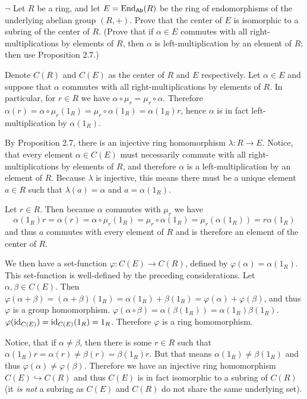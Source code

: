 \begin{problem}
	$\neg$ Let $R$ be a ring, and let $E = \mathrm{End}_{\mathsf{Ab}}(R)$ be the ring of endomorphisms of the underlying abelian group $(R, +)$. Prove that the center of $E$ is isomorphic to a subring of the center of $R$. (Prove that if $\alpha \in E$ commutes with all right-multiplications by elements of $R$, then $\alpha$ is left-multiplication by an element of $R$; then use Proposition 2.7.)
\end{problem}

\begin{solution}
	Denote $C(R)$ and $C(E)$ as the center of $R$ and $E$ respectively. Let $\alpha \in E$ and suppose that $\alpha$ commutes with all right-multiplications by elements of $R$. In particular, for $r \in R$ we have $\alpha \circ \mu_r = \mu_r \circ \alpha$. Therefore $\alpha(r) = \alpha \circ \mu_r(1_R) = \mu_r \circ \alpha(1_R) = \alpha(1_R)r$, hence $\alpha$ is in fact left-multiplication by $\alpha(1_R)$.
	
	By Proposition 2.7, there is an injective ring homomorphism $\lambda: R \to E$. Notice, that every element $\alpha \in C(E)$ must necessarily commute with all right-multiplications by elements of $R$, and therefore $\alpha$ is a left-multiplication by an element of $R$. Because $\lambda$ is injective, this means there must be a unique element $a \in R$ such that $\lambda(a) = \alpha$ and $a = \alpha(1_R)$.
	
	Let $r \in R$. Then because $\alpha$ commutes with $\mu_r$ we have
	\[
		\alpha(1_R)r = \alpha(r) = \alpha \circ \mu_r(1_R) = \mu_r \circ \alpha(1_R) = \mu_r(\alpha(1_R)) = r\alpha(1_R)
	\]
	and thus $a$ commutes with every element of $R$ and is therefore an element of the center of $R$.
	
	We then have a set-function $\varphi: C(E) \to C(R)$, defined by $\varphi(\alpha) = \alpha(1_R)$. This set-function is well-defined by the preceding considerations. Let $\alpha, \beta \in C(E)$. Then $\varphi(\alpha + \beta) = (\alpha + \beta)(1_R) = \alpha(1_R) + \beta(1_R) = \varphi(\alpha) + \varphi(\beta)$, and thus $\varphi$ is a group homomorphism. $\varphi(\alpha \circ \beta) = \alpha(\beta(1_R)) = \alpha(1_R) \beta(1_R)$. $\varphi(\mathrm{id}_{C(E)}) = \mathrm{id}_{C(E)}(1_R) = 1_R$. Therefore $\varphi$ is a ring homomorphism.
	
	Notice, that if $\alpha \neq \beta$, then there is some $r \in R$ such that $\alpha(1_R)r = \alpha(r) \neq \beta(r) = \beta(1_R)r$. But that means $\alpha(1_R) \neq \beta(1_R)$ and thus $\varphi(\alpha) \neq \varphi(\beta)$. Therefore we have an injective ring homomorphism $C(E) \hookrightarrow C(R)$ and thus $C(E)$ is in fact isomorphic to a subring of $C(R)$ (it \emph{is not} a subring as $C(E)$ and $C(R)$ do not share the same underlying set).
\end{solution}

